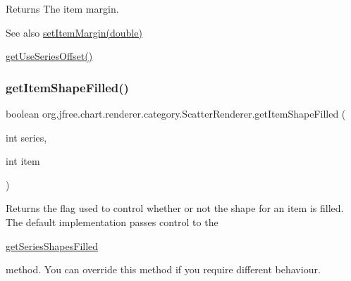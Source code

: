 \begin{DoxyReturn}{Returns}
The item margin.
\end{DoxyReturn}
\begin{DoxySeeAlso}{See also}
\mbox{\hyperlink{classorg_1_1jfree_1_1chart_1_1renderer_1_1category_1_1_scatter_renderer_a4415e005084f4401c7386d6fec53301e}{set\+Item\+Margin(double)}} 

\mbox{\hyperlink{classorg_1_1jfree_1_1chart_1_1renderer_1_1category_1_1_scatter_renderer_a7ec61a84fcdf7910f9459b2e88261249}{get\+Use\+Series\+Offset()}} 
\end{DoxySeeAlso}
\mbox{\label{classorg_1_1jfree_1_1chart_1_1renderer_1_1category_1_1_scatter_renderer_a18460cdd28e00185faf674a73267a23f}} 
\subsubsection{\texorpdfstring{get\+Item\+Shape\+Filled()}{getItemShapeFilled()}}
{\footnotesize\ttfamily boolean org.\+jfree.\+chart.\+renderer.\+category.\+Scatter\+Renderer.\+get\+Item\+Shape\+Filled (\begin{DoxyParamCaption}\item[{int}]{series,  }\item[{int}]{item }\end{DoxyParamCaption})}

Returns the flag used to control whether or not the shape for an item is filled. The default implementation passes control to the 
\begin{DoxyCode}
\mbox{\hyperlink{classorg_1_1jfree_1_1chart_1_1renderer_1_1category_1_1_scatter_renderer_aa1ab3dcf420160e7ba3002a0e33c221c}{getSeriesShapesFilled}} 
\end{DoxyCode}
 method. You can override this method if you require different behaviour.


